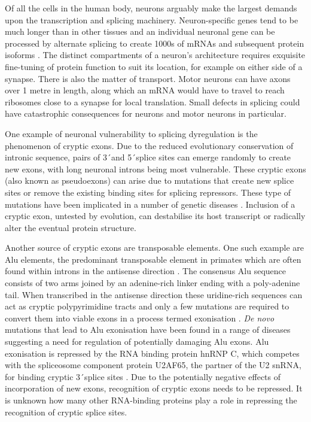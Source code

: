 Of all the cells in the human body, neurons arguably make the largest demands upon the transcription and splicing machinery. Neuron-specific genes tend to be much longer than in other tissues \citep{Sibley2015} and an individual neuronal gene can be processed by alternate splicing to create 1000s of mRNAs and subsequent protein isoforms \citep{Treutlein2014}. 
The distinct compartments of a neuron's architecture requires exquisite fine-tuning of protein function to suit its location, for example on either side of a synapse. 
There is also the matter of transport. 
Motor neurons can have axons over 1 metre in length, along which an mRNA would have to travel to reach ribosomes close to a synapse for local translation. 
Small defects in splicing could have catastrophic consequences for neurons and motor neurons in particular. 

One example of neuronal vulnerability to splicing dyregulation is the phenomenon of cryptic exons.
Due to the reduced evolutionary conservation of intronic sequence, pairs of 3\'\ and 5\'\ splice sites can emerge randomly to create new exons, with long neuronal introns being most vulnerable. 
These cryptic exons (also known as pseudoexons) can arise due to mutations that create new splice sites or remove the existing binding sites for splicing repressors. 
These type of mutations have been implicated in a number of genetic diseases \citep{Eng2004-lq, Buratti2007-iz, Vorechovsky2006-wb,Meili2009-hc}. 
Inclusion of a cryptic exon, untested by evolution, can destabilise its host transcript or radically alter the eventual protein structure. 

Another source of cryptic exons are transposable elements. 
One such example are Alu elements, the predominant transposable element in primates which are often found within introns in the antisense direction \citep{Deininger2011-hc}. 
The consensus Alu sequence consists of two arms joined by an adenine-rich linker ending with a poly-adenine tail.  
When transcribed in the antisense direction these uridine-rich sequences can act as cryptic polypyrimidine tracts and only a few mutations are required to convert them into viable exons in a process termed exonisation \citep{Sorek2002-cm}.
\textit{De novo} mutations that lead to Alu exonisation have been found in a range of diseases \citep{Vorechovsky2010-or} suggesting a need for regulation of potentially damaging Alu exons. 
Alu exonisation is repressed by the RNA binding protein hnRNP C, which competes with the spliceosome component protein U2AF65, the partner of the U2 snRNA, for binding cryptic 3\'\ splice sites \citep{Zarnack2013}. 
Due to the potentially negative effects of incorporation of new exons, recognition of cryptic exons needs to be repressed. 
It is unknown how many other RNA-binding proteins play a role in repressing the recognition of cryptic splice sites.

